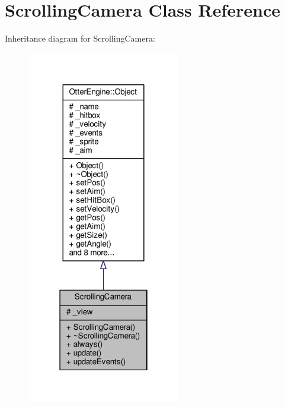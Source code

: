 \hypertarget{class_scrolling_camera}{}\section{Scrolling\+Camera Class Reference}
\label{class_scrolling_camera}


Inheritance diagram for Scrolling\+Camera\+:\nopagebreak
\begin{figure}[H]
\begin{center}
\leavevmode
\includegraphics[width=190pt]{d7/d3c/class_scrolling_camera__inherit__graph}
\end{center}
\end{figure}


